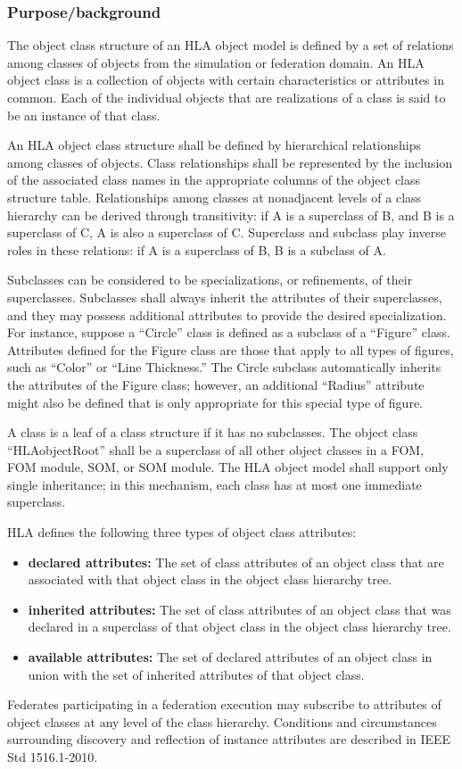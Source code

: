 \subsubsection{Purpose/background}
The object class structure of an HLA object model is defined by a set of relations among classes of objects from the simulation or federation domain. An HLA object class is a collection of objects with certain characteristics or attributes in common. Each of the individual objects that are realizations of a class is said to be an instance of that class.

An HLA object class structure shall be defined by hierarchical relationships among classes of objects. Class relationships shall be represented by the inclusion of the associated class names in the appropriate columns of the object class structure table. Relationships among classes at nonadjacent levels of a class hierarchy can be derived through transitivity: if A is a superclass of B, and B is a superclass of C, A is also a superclass of C. Superclass and subclass play inverse roles in these relations: if A is a superclass of B, B is a subclass of A.

Subclasses can be considered to be specializations, or refinements, of their superclasses. Subclasses shall always inherit the attributes of their superclasses, and they may possess additional attributes to provide the desired specialization. For instance, suppose a ``Circle'' class is defined as a subclass of a ``Figure'' class. Attributes defined for the Figure class are those that apply to all types of figures, such as ``Color'' or ``Line Thickness.'' The Circle subclass automatically inherits the attributes of the Figure class; however, an additional ``Radius'' attribute might also be defined that is only appropriate for this special type of figure.

A class is a leaf of a class structure if it has no subclasses. The object class ``HLAobjectRoot'' shall be a superclass of all other object classes in a FOM, FOM module, SOM, or SOM module. The HLA object model shall support only single inheritance; in this mechanism, each class has at most one immediate superclass.

HLA defines the following three types of object class attributes:
\begin{itemize}[leftmargin=32pt,labelwidth=10pt,labelsep=12pt,itemsep=5pt,topsep=2pt]
\item \textbf{declared attributes:} The set of class attributes of an object class that are associated with that object class in the object class hierarchy tree.
\item \textbf{inherited attributes:} The set of class attributes of an object class that was declared in a superclass of that object class in the object class hierarchy tree.
\item \textbf{available attributes:} The set of declared attributes of an object class in union with the set of inherited attributes of that object class.
\end{itemize}

Federates participating in a federation execution may subscribe to attributes of object classes at any level of the class hierarchy. Conditions and circumstances surrounding discovery and reflection of instance attributes are described in IEEE Std 1516.1-2010.
